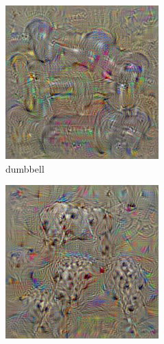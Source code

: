 \begin{figure}[htbp]
  \begin{subfigure}[b]{0.3\textwidth}
    \includegraphics[width=\textwidth]{gfx/deep-visualization-class-1}
    \caption{dumbbell}
    \label{fig:sec:context:deep-visualization-class-1}
  \end{subfigure}
  \hfill
  \begin{subfigure}[b]{0.3\textwidth}
    \includegraphics[width=\textwidth]{gfx/deep-visualization-class-2}

\end{subfigure}
\end{figure}
